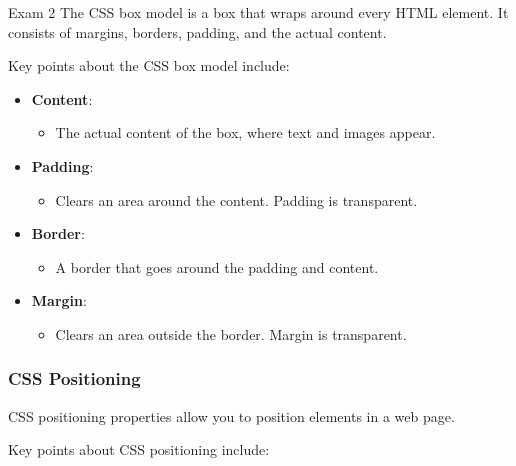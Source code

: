 \begin{examnotes}{Exam 2}
    The CSS box model is a box that wraps around every HTML element. It consists of margins, borders, padding, and the actual content.
    
    \begin{highlight}
        Key points about the CSS box model include:
        
        \begin{itemize}
            \item \textbf{Content}:
                \begin{itemize}
                    \item The actual content of the box, where text and images appear.
                \end{itemize}
            \item \textbf{Padding}:
                \begin{itemize}
                    \item Clears an area around the content. Padding is transparent.
                \end{itemize}
            \item \textbf{Border}:
                \begin{itemize}
                    \item A border that goes around the padding and content.
                \end{itemize}
            \item \textbf{Margin}:
                \begin{itemize}
                    \item Clears an area outside the border. Margin is transparent.
                \end{itemize}
        \end{itemize}
    \end{highlight}
    
    \subsubsection*{CSS Positioning}
    
    CSS positioning properties allow you to position elements in a web page.
    
    \begin{highlight}
        Key points about CSS positioning include:
        

\end{highlight}
\end{examnotes}
